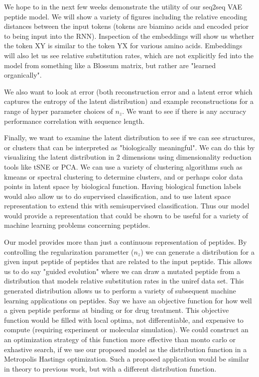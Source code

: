 We hope to in the next few weeks demonstrate the utility of our seq2seq VAE peptide model. We will show a variety of figures including the relative encoding distances between the input tokens (tokens are biamino acids and encoded prior to being input into the RNN). Inspection of the embeddings will show us whether the token XY is similar to the token YX for various amino acids. Embeddings will also let us see relative substitution rates, which are not explicitly fed into the model from something like a Blossum matrix, but rather are "learned organically".

We also want to look at error (both reconstruction error and a latent error which captures the entropy of the latent distribution) and example reconstructions for a range of hyper parameter choices of $n_z$. We want to see if there is any accuracy performance correlation with sequence length.

Finally, we want to examine the latent distribution to see if we can see structures, or clusters that can be interpreted as "biologically meaningful". We can do this by visualizing the latent distribution in 2 dimensions using dimensionality reduction tools like tSNE or PCA. We can use a variety of clustering algorithms such as kmeans or spectral clustering to determine clusters, and or perhaps color data points in latent space by biological function. Having biological function labels would also allow us to do supervised classification, and to use latent space representation to extend this with semisupervised classification. Thus our model would provide a representation that could be shown to be useful for a variety of machine learning problems concerning peptides.

Our model provides more than just a continuous representation of peptides. By controlling the regularization parametter ($n_z$) we can generate a distribution for a given input peptide of peptides that are related to the input peptide. This allows us to do say "guided evolution" where we can draw a mutated peptide from a distribution that models relative substitution rates in the uniref data set. This generated distribution allows us to perform a variety of subsequent machine learning applications on peptides. Say we have an objective function for how well a given peptide performs at binding or for drug treatment. This objective function would be filled with local optima, not differentiable, and expensive to compute (requiring experiment or molecular simulation). We could construct an an optimization strategy of this function more effective than monto carlo or exhastive search, if we use our proposed model as the distribution function in a Metropolis Hastings optimization. Such a proposed application would be similar in theory to previous work, but with a different distribution function\cite{giguere2013improved}.

